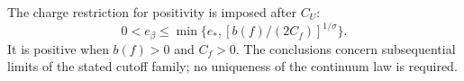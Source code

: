 The charge restriction for positivity is imposed after $C_U$:
\begin{equation}\label{eq:constants-probe-charge}
 0<e_\beta\le
       \min\{e_*,[b(f)/(2C_f)]^{1/\sigma}\}.
\end{equation}
It is positive when $b(f)>0$ and $C_f>0$.
The conclusions concern subsequential limits of the stated
cutoff family; no uniqueness of the continuum law is required.

